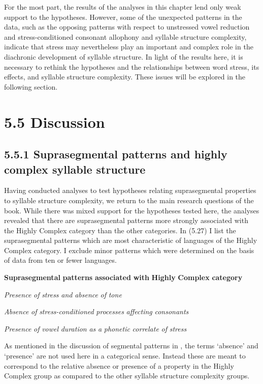   For the most part, the results of the analyses in this chapter lend only weak support to the hypotheses. However, some of the unexpected patterns in the data, such as the opposing patterns with respect to unstressed vowel reduction and stress-conditioned consonant allophony and syllable structure complexity, indicate that stress may nevertheless play an important and complex role in the diachronic development of syllable structure. In light of the results here, it is necessary to rethink the hypotheses and the relationships between word stress, its effects, and syllable structure complexity. These issues will be explored in the following section.

\section{5.5 Discussion}
\subsection{5.5.1 Suprasegmental patterns and highly complex syllable structure}

  Having conducted analyses to test hypotheses relating suprasegmental properties to syllable structure complexity, we return to the main research questions of the book. While there was mixed support for the hypotheses tested here, the analyses revealed that there are suprasegmental patterns more strongly associated with the Highly Complex category than the other categories. In (5.27) I list the suprasegmental patterns which are most characteristic of languages of the Highly Complex category. I exclude minor patterns which were determined on the basis of data from ten or fewer languages.

\ea\label{ex:(5.27)}
  \textbf{Suprasegmental} \textbf{patterns} \textbf{associated} \textbf{with} \textbf{Highly} \textbf{Complex} \textbf{category}

\textit{Presence} \textit{of} \textit{stress} \textit{and} \textit{absence} \textit{of} \textit{tone}

\textit{Absence} \textit{of} \textit{stress-conditioned} \textit{processes} \textit{affecting} \textit{consonants}

\textit{Presence} \textit{of} \textit{vowel} \textit{duration} \textit{as} \textit{a} \textit{phonetic} \textit{correlate} \textit{of} \textit{stress}
\z

  As mentioned in the discussion of segmental patterns in , the terms ‘absence’ and ‘presence’ are not used here in a categorical sense. Instead these are meant to correspond to the relative absence or presence of a property in the Highly Complex group as compared to the other syllable structure complexity groups.

